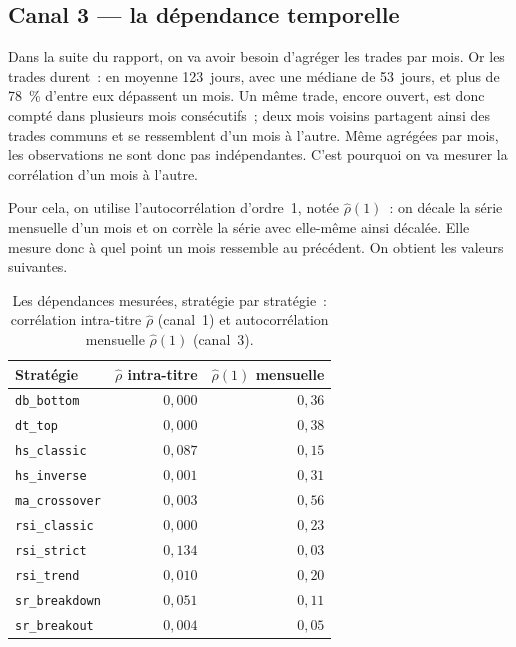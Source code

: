\subsection{Canal 3 --- la dépendance temporelle}
\label{sec:dep-canal3}


Dans la suite du rapport, on va avoir besoin d'agréger les trades par mois.
Or les trades durent~: en moyenne 123~jours, avec une médiane de 53~jours,
et plus de 78~\% d'entre eux dépassent un mois. Un même trade, encore ouvert,
est donc compté dans plusieurs mois consécutifs~; deux mois voisins partagent
ainsi des trades communs et se ressemblent d'un mois à l'autre.
Même agrégées par mois, les observations ne sont donc pas indépendantes.
C'est pourquoi on va mesurer la corrélation d'un mois à l'autre.

Pour cela, on utilise l'autocorrélation d'ordre~1, notée
$\hat\rho(1)$~: on décale la série mensuelle d'un mois et on corrèle la série
avec elle-même ainsi décalée. Elle mesure donc à quel point un mois ressemble
au précédent. On obtient les valeurs suivantes.
\begin{table}[H]
\centering
\caption{Les dépendances mesurées, stratégie par stratégie~:
corrélation intra-titre $\hat\rho$ (canal~1) et autocorrélation
mensuelle $\hat\rho(1)$ (canal~3).}
\label{tab:dep-mesures}
\small
\begin{tabular}{@{}lrr@{}}
\toprule
Stratégie & $\hat\rho$ intra-titre & $\hat\rho(1)$ mensuelle \\
\midrule
\texttt{db\_bottom}    & $0{,}000$ & $0{,}36$ \\
\texttt{dt\_top}       & $0{,}000$ & $0{,}38$ \\
\texttt{hs\_classic}   & $0{,}087$ & $0{,}15$ \\
\texttt{hs\_inverse}   & $0{,}001$ & $0{,}31$ \\
\texttt{ma\_crossover} & $0{,}003$ & $0{,}56$ \\
\texttt{rsi\_classic}  & $0{,}000$ & $0{,}23$ \\
\texttt{rsi\_strict}   & $0{,}134$ & $0{,}03$ \\
\texttt{rsi\_trend}    & $0{,}010$ & $0{,}20$ \\
\texttt{sr\_breakdown} & $0{,}051$ & $0{,}11$ \\
\texttt{sr\_breakout}  & $0{,}004$ & $0{,}05$ \\
\bottomrule
\end{tabular}
\end{table}

